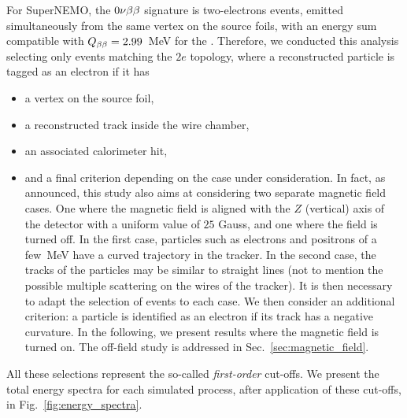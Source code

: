 For SuperNEMO, the $0\nu\beta\beta$ signature is two-electrons events, emitted simultaneously from the same vertex on the source foils, with an energy sum compatible with $Q_{\beta\beta} = 2.99$~MeV for the \Se.
Therefore, we conducted this analysis selecting only events matching the $2e$ topology, where a reconstructed particle is tagged as an electron if it has
\begin{itemize}
\item a vertex on the source foil,
\item a reconstructed track inside the wire chamber,
\item an associated calorimeter hit,
\item and a final criterion depending on the case under consideration.
  In fact, as announced, this study also aims at considering two separate magnetic field cases.
  One where the magnetic field is aligned with the $Z$ (vertical) axis of the detector with a uniform value of $25$ Gauss, and one where the field is turned off.
  In the first case, particles such as electrons and positrons of a few~MeV have a curved trajectory in the tracker.
  In the second case, the tracks of the particles may be similar to straight lines (not to mention the possible multiple scattering on the wires of the tracker).
  It is then necessary to adapt the selection of events to each case.
  We then consider an additional criterion: a particle is identified as an electron if its track has a negative curvature.
  In the following, we present results where the magnetic field is turned on.
  The off-field study is addressed in Sec.~\ref{sec:magnetic_field}.
\end{itemize}
All these selections represent the so-called \emph{first-order} cut-offs.
We present the total energy spectra for each simulated process, after application of these cut-offs, in Fig.~\ref{fig:energy_spectra}.
